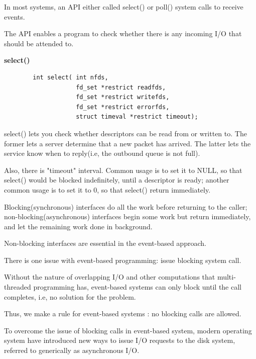     In most systems, an API either called select() or poll() system calls to receive events.

    The API enables a program to check whether there is any incoming I/O that should be attended to.

    \textbf{select()}

    \begin{lstlisting}
        int select( int nfds, 
                    fd_set *restrict readfds,
                    fd_set *restrict writefds, 
                    fd_set *restrict errorfds,
                    struct timeval *restrict timeout);
    \end{lstlisting}

    select() lets you check whether descriptors can be read from or written to.
    The former lets a server determine that a new packet has arrived. The latter lets 
    the service know when to reply(i.e, the outbound queue is not full).

    Also, there is "timeout" interval. Common usage is to set it to NULL, so that select() would be blocked 
    indefinitely, until a descriptor is ready; another common usage is to set it to 0, so that select()
    return immediately.


    Blocking(synchronous) interfaces do all the work before returning to the caller; non-blocking(asynchronous)
    interfaces begin some work but return immediately, and let the remaining work done in background.

    Non-blocking interfaces are essential in the event-based approach.


    There is one issue with event-based programming: issue blocking system call.

    Without the nature of overlapping I/O and other computations that multi-threaded programming has,
    event-based systems can only block until the call completes, i.e, no solution for the problem.

    Thus, we make a rule for event-based systems : no blocking calls are allowed.


    To overcome the issue of blocking calls in event-based system, modern operating system have introduced 
    new ways to issue I/O requests to the disk system, referred to generically as asynchronous I/O.

